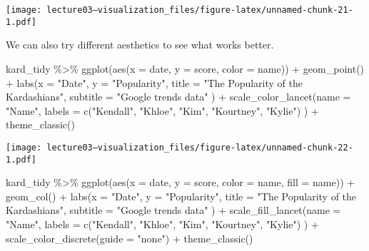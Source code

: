 \documentclass[
]{article}
\newenvironment{Shaded}{\begin{snugshade}}{\end{snugshade}}
\newcommand{\AttributeTok}[1]{\textcolor[rgb]{0.77,0.63,0.00}{#1}}
\newcommand{\FunctionTok}[1]{\textcolor[rgb]{0.00,0.00,0.00}{#1}}
\newcommand{\NormalTok}[1]{#1}
\newcommand{\SpecialCharTok}[1]{\textcolor[rgb]{0.00,0.00,0.00}{#1}}
\newcommand{\StringTok}[1]{\textcolor[rgb]{0.31,0.60,0.02}{#1}}
\begin{document}
\texttt{[image: lecture03---visualization\_files/figure-latex/unnamed-chunk-21-1.pdf]}

We can also try different aesthetics to see what works better.

\begin{Shaded}
\begin{Highlighting}[]
\NormalTok{kard\_tidy }\SpecialCharTok{\%\textgreater{}\%} 
  \FunctionTok{ggplot}\NormalTok{(}\FunctionTok{aes}\NormalTok{(}\AttributeTok{x =}\NormalTok{ date, }\AttributeTok{y =}\NormalTok{ score, }\AttributeTok{color =}\NormalTok{ name)) }\SpecialCharTok{+}
  \FunctionTok{geom\_point}\NormalTok{() }\SpecialCharTok{+}
  \FunctionTok{labs}\NormalTok{(}\AttributeTok{x =} \StringTok{"Date"}\NormalTok{,}
       \AttributeTok{y =} \StringTok{"Popularity"}\NormalTok{,}
       \AttributeTok{title =} \StringTok{"The Popularity of the Kardashians"}\NormalTok{,}
       \AttributeTok{subtitle =} \StringTok{"Google trends data"}
\NormalTok{       ) }\SpecialCharTok{+}
  \FunctionTok{scale\_color\_lancet}\NormalTok{(}\AttributeTok{name =} \StringTok{"Name"}\NormalTok{,}
                     \AttributeTok{labels =} \FunctionTok{c}\NormalTok{(}\StringTok{"Kendall"}\NormalTok{, }\StringTok{"Khloe"}\NormalTok{, }\StringTok{"Kim"}\NormalTok{, }\StringTok{"Kourtney"}\NormalTok{, }\StringTok{"Kylie"}\NormalTok{)}
\NormalTok{                       ) }\SpecialCharTok{+}
  \FunctionTok{theme\_classic}\NormalTok{()}
\end{Highlighting}
\end{Shaded}

\texttt{[image: lecture03---visualization\_files/figure-latex/unnamed-chunk-22-1.pdf]}

\begin{Shaded}
\begin{Highlighting}[]
\NormalTok{kard\_tidy }\SpecialCharTok{\%\textgreater{}\%} 
  \FunctionTok{ggplot}\NormalTok{(}\FunctionTok{aes}\NormalTok{(}\AttributeTok{x =}\NormalTok{ date, }\AttributeTok{y =}\NormalTok{ score, }\AttributeTok{color =}\NormalTok{ name, }\AttributeTok{fill =}\NormalTok{ name)) }\SpecialCharTok{+}
  \FunctionTok{geom\_col}\NormalTok{() }\SpecialCharTok{+}
  \FunctionTok{labs}\NormalTok{(}\AttributeTok{x =} \StringTok{"Date"}\NormalTok{,}
       \AttributeTok{y =} \StringTok{"Popularity"}\NormalTok{,}
       \AttributeTok{title =} \StringTok{"The Popularity of the Kardashians"}\NormalTok{,}
       \AttributeTok{subtitle =} \StringTok{"Google trends data"}
\NormalTok{       ) }\SpecialCharTok{+}
  \FunctionTok{scale\_fill\_lancet}\NormalTok{(}\AttributeTok{name =} \StringTok{"Name"}\NormalTok{,}
                     \AttributeTok{labels =} \FunctionTok{c}\NormalTok{(}\StringTok{"Kendall"}\NormalTok{, }\StringTok{"Khloe"}\NormalTok{, }\StringTok{"Kim"}\NormalTok{, }\StringTok{"Kourtney"}\NormalTok{, }\StringTok{"Kylie"}\NormalTok{)}
\NormalTok{                       ) }\SpecialCharTok{+}
  \FunctionTok{scale\_color\_discrete}\NormalTok{(}\AttributeTok{guide =} \StringTok{"none"}\NormalTok{) }\SpecialCharTok{+}
  \FunctionTok{theme\_classic}\NormalTok{()}
\end{Highlighting}
\end{Shaded}
\end{document}
